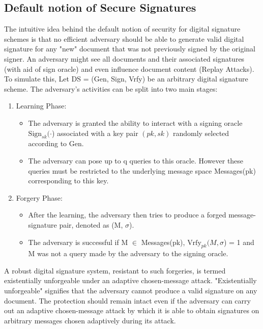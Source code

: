 \documentclass[]{final_report}
\theoremstyle{definition}
\begin{document}
\subsection{Default notion of Secure Signatures}
The intuitive idea behind the default notion of security for digital signature schemes is that no efficient adversary should be able to generate valid digital signature for any "new" document that was not previously signed by the original signer.
An adversary might see all documents and their associated signatures (with aid of sign oracle) and even influence document content (Replay Attacks).
To simulate this, Let DS = (Gen, Sign, Vrfy) be an arbitrary digital signature scheme. The adversary's activities can be split into two main stages:
\begin{enumerate}
    \item Learning Phase:
\begin{itemize}
    \item The adversary is granted the ability to interact with a signing oracle $\text{Sign}_{sk}(\cdot$) associated with a key pair $(pk ,sk)$ randomly selected according to Gen.
    \item The adversary can pose up to q queries to this oracle. However these queries must be restricted to the underlying message space Messages(pk) corresponding to this key. 
\end{itemize}
    \item Forgery Phase:
\begin{itemize}
    \item After the learning, the adversary then tries to produce a forged message-signature pair, denoted as (M, $\sigma$).
    \item The adversary is successful if M $\in$ Messages(pk), $\text{Vrfy}_{pk} (M, \sigma$) = 1 and M was not a query made by the adversary to the signing oracle.
\end{itemize}
\end{enumerate}

A robust digital signature system, resistant to such forgeries, is termed existentially unforgeable under an adaptive chosen-message attack. "Existentially unforgeable" signifies that the adversary cannot produce a valid signature on any document. The protection should remain intact even if the adversary can carry out an adaptive chosen-message attack by which it is able to obtain signatures on arbitrary messages chosen adaptively during its attack.
\end{document}
